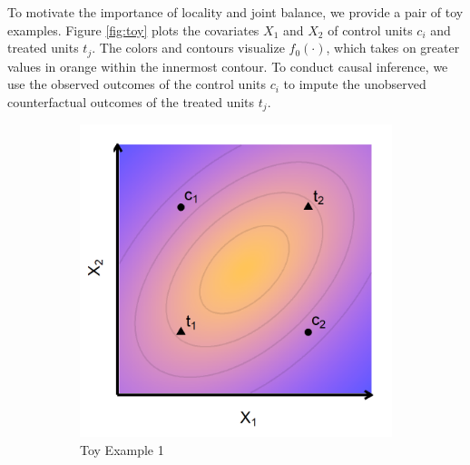 \documentclass{article}
\begin{document}
To motivate the importance of locality and joint balance, we provide a pair of toy examples.
Figure \ref{fig:toy} plots the covariates $X_1$ and $X_2$ of control units $c_i$ and treated units $t_j$.
The colors and contours visualize $f_0(\cdot)$, which takes on greater values in orange within the innermost contour.
To conduct causal inference, we use the observed outcomes of the control units $c_i$ to impute the unobserved counterfactual outcomes of the treated units $t_j$.
\begin{figure}[t]
    \centering
    \begin{subfigure}[ht]{0.4\textwidth}
         \centering
         \includegraphics[width=\textwidth]{writeup/figures/toyexample1.png}
         \caption{Toy Example 1}
         \label{fig:toy1}
     \end{subfigure}
     \hspace{5mm}
     \begin{subfigure}[ht]{0.4\textwidth}
         \centering

\end{subfigure}
\end{figure}
\end{document}
